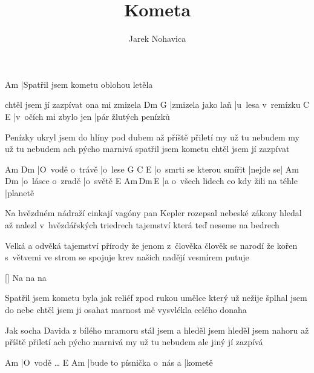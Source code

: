 \documentclass{song}
\title{Kometa}
\author{Jarek Nohavica}
\begin{document}
\strophe
Am
|Spatřil jsem kometu oblohou letěla

chtěl jsem jí zazpívat ona mi zmizela
Dm                G\7
|zmizela jako laň |u~lesa v~remízku
C                     E\7
|v~očích mi zbylo jen |pár žlutých penízků
\endstrophe

\strophe*
Penízky ukryl jsem do hlíny pod dubem
až příště přiletí my už tu nebudem
my už tu nebudem ach pýcho marnivá
spatřil jsem kometu chtěl jsem jí zazpívat
\endstrophe

Am              Dm
|O~vodě o~trávě |o~lese
G\7                       C        E\7
|o~smrti se kterou smířit |nejde se|
Am               Dm
|o~lásce o~zradě |o~světě
E\7                                    Am\,Dm\,E\7
|a o~všech lidech co kdy žili na téhle |planetě
\endstrophe

\strophe*
Na hvězdném nádraží cinkají vagóny
pan Kepler rozepsal nebeské zákony
hledal až nalezl v~hvězdářských triedrech
tajemství která teď neseme na bedrech
\endstrophe

\strophe*
Velká a odvěká tajemství přírody
že jenom z~člověka člověk se narodí
že kořen s~větvemi ve strom se spojuje
krev našich nadějí vesmírem putuje
\endstrophe

\ref{} Na na na

\strophe*
Spatřil jsem kometu byla jak reliéf
zpod rukou umělce který už nežije
šplhal jsem do nebe chtěl jsem ji osahat
marnost mě vysvlékla celého donaha
\endstrophe

\strophe*
Jak socha Davida z bílého mramoru
stál jsem a hleděl jsem hleděl jsem nahoru
až příště přiletí ach pýcho marnivá
my už tu nebudem ale jiný jí zazpívá
\endstrophe

Am
|O~vodě \ldots{}
E\7                       Am
|bude to písnička o~nás a |kometě
\endstrophe
\end{document}
